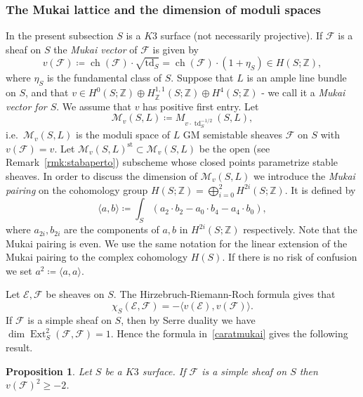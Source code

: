\documentclass[11pt]{amsart}
\newcommand{\ZZ}{{\mathbb Z}}
\let\mathcal\mathscr
\def\cE{\mathcal{E}}
\def\cF{\mathcal{F}}
\def\cM{\mathcal{M}}
\DeclareMathOperator{\ch}{ch}
\DeclareMathOperator{\Ext}{Ext}
\DeclareMathOperator{\st}{st}
\DeclareMathOperator{\td}{td}
\newcommand{\la}{\langle}
\newcommand{\ra}{\rangle}
\newtheorem{prp}[lmm]{Proposition}
\theoremstyle{definition}
\theoremstyle{remark}
\begin{document}
\subsubsection{The Mukai lattice and the dimension of  moduli spaces}
%
In  the present subsection $S$ is a $K3$ surface (not necessarily projective).  If $\cF$ is  a sheaf on $S$ the  \emph{Mukai vector} of $\cF$ is given by
%
\begin{equation}
%
v(\cF)\coloneqq \ch(\cF)\cdot\sqrt{\td_S}=\ch(\cF)\cdot(1+\eta_S)\in H(S;\ZZ),
%
\end{equation}
%
where $\eta_S$ is the fundamental class of $S$. Suppose that $L$ is an ample line bundle on $S$, and that 
$v\in H^0(S;\ZZ)\oplus H^{1,1}_{\ZZ}(S;\ZZ)\oplus H^{4}(S;\ZZ)$ - we call it a \emph{Mukai vector for $S$}.
We assume that $v$ has positive first entry. Let
%
\begin{equation}
%
\cM_v(S,L)\coloneqq M_{v\cdot \td_S^{-1/2}}(S,L),
%
\end{equation}
%
i.e.~$\cM_v(S,L)$ is the moduli space of $L$ GM semistable sheaves $\cF$ on $S$ with $v(\cF)=v$. Let 
$\cM_v(S,L)^{\st}\subset \cM_v(S,L)$ be the open (see Remark~\ref{rmk:stabaperto}) subscheme whose closed points parametrize stable sheaves.
In order to discuss the  dimension of $\cM_v(S,L)$ we introduce 
the \emph{Mukai pairing} on the cohomology group $H(S;\ZZ)=\bigoplus_{i=0}^2 H^{2i}(S;\ZZ)$. It  is defined by
%
\begin{equation}
%
\la a,b\ra\coloneqq \int_S(a_2\cdot b_2-a_0\cdot b_4-a_4\cdot b_0),
%
\end{equation}
%
where $a_{2i},b_{2i}$ are the components of $a,b$ in $H^{2i}(S;\ZZ)$ respectively. Note that the Mukai pairing is even. We use the same notation for the linear extension of the Mukai pairing to the complex  cohomology $H(S)$. If there is no risk of confusion we set $a^2\coloneqq \la a,a\ra$. 

Let $\cE,\cF$ be  sheaves on $S$. The Hirzebruch-Riemann-Roch formula gives that
%
\begin{equation}\label{caratmukai}
%
\chi_S(\cE,\cF)=-\la v(\cE),v(\cF)\ra.
%
\end{equation}
%
If $\cF$ is a simple sheaf on $S$, then by Serre duality we have $\dim\Ext^2_S(\cF,\cF)=1$. Hence the formula in~\eqref{caratmukai} gives the following result.
%
\begin{prp}\label{prp:sesempl}
%
Let  $S$ be a $K3$ surface. If  $\cF$ is a simple   sheaf on $S$ then $ v(\cF)^2 \ge -2$.
%
\end{prp}
%
 
\end{document}
